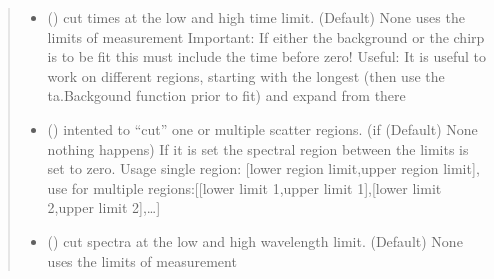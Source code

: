 \documentclass[letterpaper,10pt,english]{sphinxmanual}
\begin{document}
\begin{fulllineitems}
\begin{quote}
\begin{description}
\begin{itemize}
\item {} 
 (\sphinxstyleliteralemphasis{\sphinxupquote{ (}}\sphinxstyleliteralemphasis{\sphinxupquote{)}}\sphinxstyleliteralemphasis{\sphinxupquote{, }}) \textendash{} cut times at the low and high time limit. (Default) None uses the limits of measurement
Important: If either the background or the chirp is to be fit this must include the
time before zero! Useful: It is useful to work on different regions, starting with
the longest (then use the ta.Backgound function prior to fit) and expand from there

\item {} 
 (\sphinxstyleliteralemphasis{\sphinxupquote{ (}}\sphinxstyleliteralemphasis{\sphinxupquote{, }}\sphinxstyleliteralemphasis{\sphinxupquote{)}}\sphinxstyleliteralemphasis{\sphinxupquote{, }}) \textendash{} intented to “cut” one or multiple scatter regions. (if (Default) None nothing
happens) If it is set the spectral region between the limits is set to zero.
Usage single region: {[}lower region limit,upper region limit{]},
use for multiple regions:{[}{[}lower limit 1,upper limit 1{]},{[}lower limit 2,upper limit 2{]},…{]}

\item {} 
 (\sphinxstyleliteralemphasis{\sphinxupquote{ (}}\sphinxstyleliteralemphasis{\sphinxupquote{)}}\sphinxstyleliteralemphasis{\sphinxupquote{, }}) \textendash{} cut spectra at the low and high wavelength limit. (Default) None
uses the limits of measurement


\end{itemize}
\end{description}
\end{quote}
\end{fulllineitems}
\end{document}
